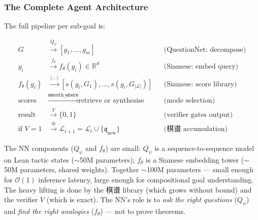 \documentclass[11pt,a4paper]{article}
\theoremstyle{definition}
\theoremstyle{remark}
\begin{document}
\subsubsection*{The Complete Agent Architecture}

The full pipeline per sub-goal is:

\begin{equation}\label{eq:agent_chain}
\boxed{
\begin{aligned}
G &\xrightarrow{Q_\psi} [g_1, \ldots, g_m] &&\text{(QuestionNet: decompose)} \\
g_i &\xrightarrow{f_\theta} f_\theta(g_i) \in \mathbb{R}^d &&\text{(Siamese: embed query)} \\
f_\theta(g_i) &\xrightarrow{\langle\cdot, \cdot\rangle} [s(g_i, G_1), \ldots, s(g_i, G_{|\mathcal{L}|})] &&\text{(Siamese: score library)} \\
\text{scores} &\xrightarrow{\texttt{smooth\_where}} \text{retrieve or synthesise} &&\text{(mode selection)} \\
\text{result} &\xrightarrow{V} \{0,1\} &&\text{(verifier gates output)} \\
\text{if } V=1 &\xrightarrow{\oplus} \mathcal{L}_{t+1} = \mathcal{L}_t \cup \{\mathfrak{q}_{\mathrm{new}}\} &&\text{(棋谱 accumulation)}
\end{aligned}
}
\end{equation}

The NN components ($Q_\psi$ and $f_\theta$) are small: $Q_\psi$ is a sequence-to-sequence model on Lean tactic states ($\sim$50M parameters); $f_\theta$ is a Siamese embedding tower ($\sim$50M parameters, shared weights). Together $\sim$100M parameters --- small enough for $\mathcal{O}(1)$ inference latency, large enough for compositional goal understanding. The heavy lifting is done by the 棋谱 library (which grows without bound) and the verifier $V$ (which is exact). The NN's role is to \emph{ask the right questions} ($Q_\psi$) and \emph{find the right analogies} ($f_\theta$) --- not to prove theorems.
\end{document}
